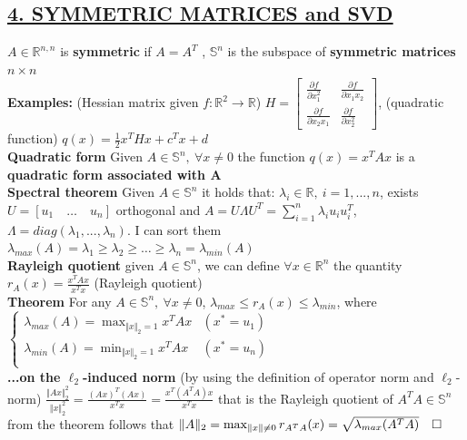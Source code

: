 \documentclass[a4paper]{article}
\begin{document}
\subsection*{\color{cyan}
\textsf{\underline{4. SYMMETRIC MATRICES and SVD}}}
$A\in\mathbb{R}^{n,n}$ is \textbf{symmetric} if $A=A^T$ , $\mathbb{S}^n$ is the subspace of \textbf{symmetric matrices} $n\times{n}$ \\
\textbf{Examples:} (Hessian matrix given $f:\mathbb{R}^2\to\mathbb{R}$) $H=\begin{bmatrix}
    \frac{\partial{f}}{\partial{x_1^2}}&\frac{\partial{f}}{\partial{x_1{x_2}}}\\
    \frac{\partial{f}}{\partial{x_2{x_1}}}&\frac{\partial{f}}{\partial{x_2^2}}
\end{bmatrix}$, (quadratic function) $q(x)=\frac{1}{2}x^T{H}x+c^T{x}+d$\\
\textbf{Quadratic form} Given $A\in\mathbb{S}^n, \ \forall x \ne 0$ the function $q(x)=x^T A x$ is a \textbf{quadratic form associated with A}\\
\textbf{Spectral theorem} Given $A\in\mathbb{S}^n$ it holds that: $\lambda_i\in\mathbb{R}, \ i=1,...,n$, exists $U=[u_1\quad\dots\quad{u_n}]$ orthogonal and $A=U\Lambda{U^T}=\sum_{i=1}^{n}{\lambda_i{u_i}u_i^T}$, $\Lambda=diag(\lambda_1, ..., \lambda_n)$. I can sort them $\lambda_{max}(A)=\lambda_1 \ge \lambda_2 \ge \dots \ge \lambda_n=\lambda_{min}(A)$\\
\textbf{Rayleigh quotient} given $A\in\mathbb{S}^n$, we can define $\forall x \in \mathbb{R}^n$ the quantity $r_{A}(x)=\frac{x^T{A}x}{x^T{x}}$ (Rayleigh quotient)\\
\textbf{Theorem} For any $A\in\mathbb{S}^n, \ \forall x \ne 0$, $\lambda_{max} \le r_{A}(x) \le \lambda_{min}$, where 
$\begin{cases}
    \lambda_{max}(A)=\max_{\Vert x \Vert_2=1} {x^T A x}&(x^*=u_1)\\
    \lambda_{min}(A)=\min_{\Vert x \Vert_2=1} {x^T A x}&(x^*=u_n)\\
\end{cases}$\\
\textbf{...on the $\ell_2$-induced norm} (by using the definition of operator norm and $\ell_2$-norm) $\frac{\Vert Ax \Vert_2^2}{\Vert x \Vert_2^2}=\frac{(Ax)^T{(Ax)}}{x^T{x}} = \frac{x^T{(A^T{A})x}}{x^T{x}}$ that is the Rayleigh quotient of $A^T{A}\in\mathbb{S}^n$ from the theorem follows that $\Vert A \Vert_2 = \max_{\Vert x \Vert \ne 0} r_{\small A^T A}(x)=\sqrt{\lambda_{max}(A^T A)} \quad \square$ \\
\end{document}
